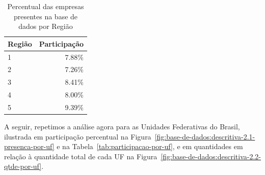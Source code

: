 \begin{table}[htb]
\centering
\caption{Percentual das empresas presentes na base de dados por Região}
\label{tab:participacao-por-regiao}
\begin{tabular}{lr}
\toprule
Região & Participação \\
\midrule
1      &    7.88\% \\
2      &    7.26\% \\
3      &    8.41\% \\
4      &    8.00\% \\
5      &    9.39\% \\
\bottomrule
\end{tabular}
\fdadospesquisa
\end{table}

A seguir, repetimos a análise agora para as Unidades Federativas do Brasil, ilustrada em participação percentual na Figura~\ref{fig:base-de-dados:descritiva-2.1-presenca-por-uf} e na Tabela~\ref{tab:participacao-por-uf}, e em quantidades em relação à quantidade total de cada UF na Figura~\ref{fig:base-de-dados:descritiva-2.2-qtde-por-uf}.

